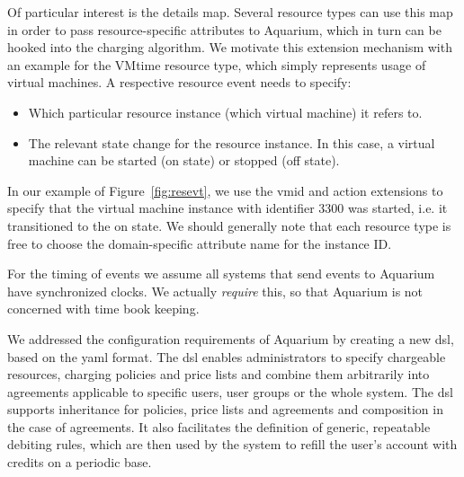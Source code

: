 \documentclass[letterpaper,twocolumn,10pt]{article}
\begin{document}
Of particular interest is the \textsf{details} map. Several resource
types can use this map in order to pass resource-specific attributes
to Aquarium, which in turn can be hooked into the charging algorithm.
We motivate this extension mechanism with an example for the
\textsf{VMtime} resource type, which simply represents usage of
virtual machines. A respective resource event needs to specify:
\begin{itemize}
\item Which particular resource instance (which virtual machine) it refers to.
\item The relevant state change for the resource instance. In this case, a virtual machine can be started (\textsf{on} state) or stopped (\textsf{off} state).
\end{itemize}

In our example of Figure~\ref{fig:resevt}, we use the \textsf{vmid}
and \textsf{action} extensions to specify that the virtual machine
instance with identifier \textsf{3300} was started, i.e. it
transitioned to the \textsf{on} state. We should generally note that each
resource type is free to choose the domain-specific attribute name for
the instance \textsf{ID}.

For the timing of events we assume all systems that send events to
Aquarium have synchronized clocks. We actually \textit{require} this,
so that Aquarium is not concerned with time book keeping.

We addressed the configuration requirements of Aquarium by creating a
new {\sc dsl}, based on the {\sc yaml} format. The {\sc dsl} enables
administrators to specify chargeable resources, charging policies and
price lists and combine them arbitrarily into agreements applicable to
specific users, user groups or the whole system. The {\sc dsl}
supports inheritance for policies, price lists and agreements and
composition in the case of agreements. It also facilitates the
definition of generic, repeatable debiting rules, which are then used
by the system to refill the user's account with credits on a periodic
base.
\end{document}
